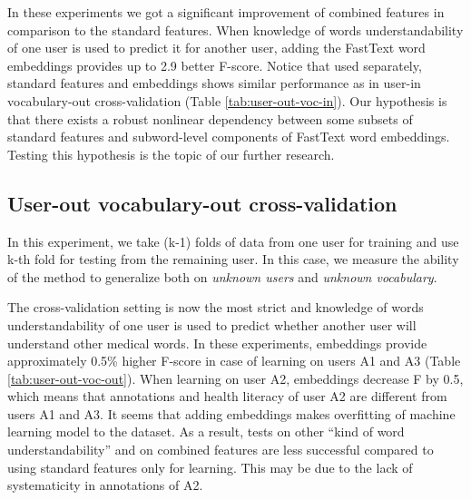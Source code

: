 In these experiments we got a significant improvement of combined features in comparison to the standard features. When knowledge of words understandability of one user is used to predict it for another user, adding the FastText word embeddings provides up to 2.9 better F-score. Notice that used separately, standard features and embeddings shows similar performance as in user-in vocabulary-out cross-validation (Table \ref{tab:user-out-voc-in}). Our hypothesis is that there exists a robust nonlinear dependency between some subsets of standard features and subword-level components of FastText word embeddings. Testing this hypothesis is the topic of our further research.

\subsection{User-out vocabulary-out cross-validation}

In this experiment, we take (k-1) folds of data from one user for training and use k-th fold for testing from the remaining user. In this case, we measure the ability of the method to generalize both on \textit{unknown users} and \textit{ unknown vocabulary}.

The cross-validation setting is now the most strict and knowledge of words understandability of one user is used to predict whether another user will understand other medical words. In these experiments, embeddings provide approximately 0.5\% higher F-score in case of learning on users A1 and A3 (Table \ref{tab:user-out-voc-out}). When learning on user A2, embeddings decrease F by 0.5, which means that annotations and health literacy of user A2 are different from users A1 and A3. It seems that adding embeddings makes overfitting of machine learning model to the dataset. As a result, tests on other ``kind of word understandability'' and on combined features are less successful compared to using standard features only for learning. This may be due to the lack of systematicity in annotations of A2.

